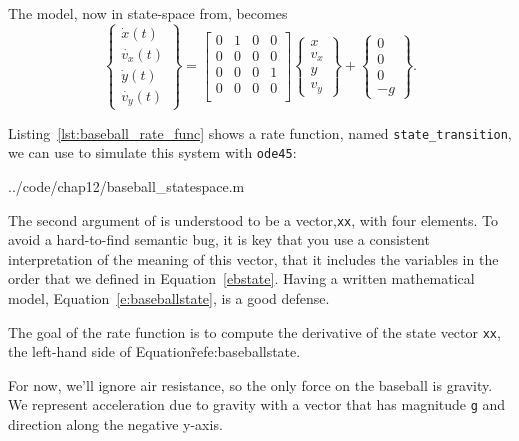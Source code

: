 The model, now in state-space from, becomes
\begin{equation}\label{e:baseballstate}
    \left\{ \begin{array}{c}
        \dot{x}(t) \\ \dot{v_x}(t)  \\ \dot{y}(t) \\ \dot{v_y}(t)
    \end{array}\right\}
    =
    \left[ \begin{array}{cccc}
        0  & 1 & 0 & 0\\
        0 & 0 & 0 & 0\\
        0 & 0 & 0 & 1\\
        0 & 0 & 0 & 0\\
    \end{array}
    \right]
    \left\{ \begin{array}{c}
        x \\ v_x  \\ y \\ v_y
    \end{array}\right\}
    +
    \left\{\begin{array}{c}
         0 \\ 0 \\ 0 \\ -g
    \end{array}
    \right\}
    .
\end{equation}

Listing~\ref{lst:baseball_rate_func} shows a rate function, named \lstinline{state_transition}, we can use to simulate this system with \lstinline{ode45}:


{../code/chap12/baseball_statespace.m}

The second argument of is understood to be a vector,\lstinline{xx}, with four elements.  To avoid a hard-to-find semantic bug, it is key that you use a consistent interpretation of the meaning of this vector, that it includes the variables in the order that we defined in Equation~\ref{ebstate}.  Having a written mathematical model, Equation~\ref{e:baseballstate}, is a good defense.

The goal of the rate function is to compute the derivative of the state vector \lstinline{xx}, the left-hand side of Equation\~ref{e:baseballstate}.   

For now, we'll ignore air resistance, so the only force on the baseball is gravity.  We represent acceleration due to gravity with a vector that has magnitude \lstinline{g} and direction along the negative y-axis.

